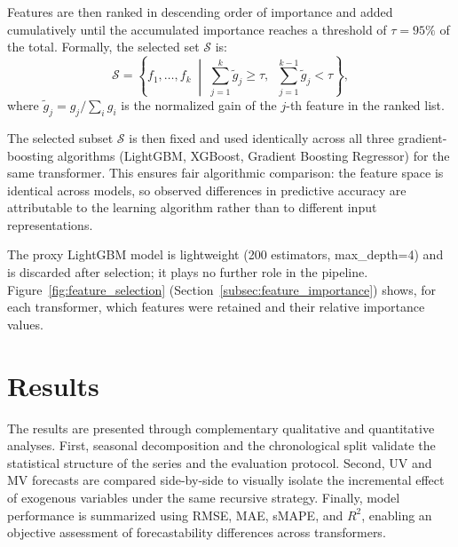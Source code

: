 Features are then ranked in descending order of importance and added cumulatively until the accumulated importance reaches a threshold of $\tau = 95\%$ of the total. Formally, the selected set $\mathcal{S}$ is:
\begin{equation}
\mathcal{S} = \left\{ f_1, \dots, f_k \;\middle|\; \sum_{j=1}^{k} \tilde{g}_j \geq \tau,\;\; \sum_{j=1}^{k-1} \tilde{g}_j < \tau \right\},
\end{equation}
\noindent where $\tilde{g}_j = g_j / \sum_i g_i$ is the normalized gain of the $j$-th feature in the ranked list.

The selected subset $\mathcal{S}$ is then fixed and used identically across all three gradient-boosting algorithms (LightGBM, XGBoost, Gradient Boosting Regressor) for the same transformer. This ensures fair algorithmic comparison: the feature space is identical across models, so observed differences in predictive accuracy are attributable to the learning algorithm rather than to different input representations.

The proxy LightGBM model is lightweight (200 estimators, max\_depth=4) and is discarded after selection; it plays no further role in the pipeline. Figure~\ref{fig:feature_selection} (Section~\ref{subsec:feature_importance}) shows, for each transformer, which features were retained and their relative importance values.


\section{Results}
\label{sec:results}

The results are presented through complementary qualitative and quantitative analyses. First, seasonal decomposition and the chronological split validate the statistical structure of the series and the evaluation protocol. Second, UV and MV forecasts are compared side-by-side to visually isolate the incremental effect of exogenous variables under the same recursive strategy. Finally, model performance is summarized using RMSE, MAE, sMAPE, and $R^2$, enabling an objective assessment of forecastability differences across transformers.



